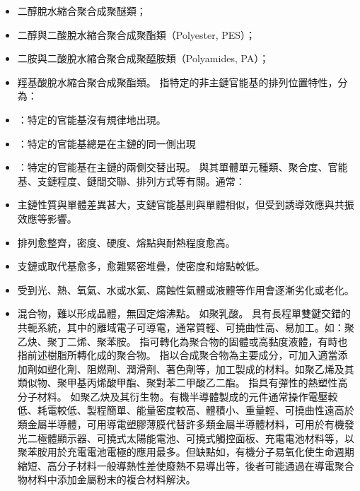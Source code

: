 \documentclass[a4paper,12pt]{report}
\begin{document}
\begin{itemize}
\begin{itemize}
\item 二醇脫水縮合聚合成聚醚類；
\item 二醇與二酸脫水縮合聚合成聚酯類（Polyester, PES）；
\item 二胺與二酸脫水縮合聚合成聚醯胺類（Polyamides, PA）；
\item 羥基酸脫水縮合聚合成聚酯類。
\eit
{}
指特定的非主鏈官能基的排列位置特性，分為：
\bit
\item {}：特定的官能基沒有規律地出現。
\item {}：特定的官能基總是在主鏈的同一側出現
\item {}：特定的官能基在主鏈的兩側交替出現。
\eit
{}
與其單體單元種類、聚合度、官能基、支鏈程度、鏈間交聯、排列方式等有關。通常：
\bit
\item 主鏈性質與單體差異甚大，支鏈官能基則與單體相似，但受到誘導效應與共振效應等影響。
\item 排列愈整齊，密度、硬度、熔點與耐熱程度愈高。
\item 支鏈或取代基愈多，愈難緊密堆疊，使密度和熔點較低。
\item 受到光、熱、氧氣、水或水氣、腐蝕性氣體或液體等作用會逐漸劣化或老化。
\item 混合物，難以形成晶體，無固定熔沸點。
\eit
{}
如聚乳酸。
具有長程單雙鍵交錯的共軛系統，其中的離域電子可導電，通常質輕、可撓曲性高、易加工。如：聚乙炔、聚丁二烯、聚苯胺。
指可轉化為聚合物的固體或高黏度液體，有時也指前述樹脂所轉化成的聚合物。
指以合成聚合物為主要成分，可加入適當添加劑如塑化劑、阻燃劑、潤滑劑、著色劑等，加工製成的材料。如聚乙烯及其類似物、聚甲基丙烯酸甲酯、聚對苯二甲酸乙二酯。
指具有彈性的熱塑性高分子材料。
如聚乙炔及其衍生物。有機半導體製成的元件通常操作電壓較低、耗電較低、製程簡單、能量密度較高、體積小、重量輕、可撓曲性遠高於類金屬半導體，可用導電塑膠薄膜代替許多類金屬半導體材料，可用於有機發光二極體顯示器、可撓式太陽能電池、可撓式觸控面板、充電電池材料等，以聚苯胺用於充電電池電極的應用最多。但缺點如，有機分子易氧化使生命週期縮短、高分子材料一般導熱性差使廢熱不易導出等，後者可能通過在導電聚合物材料中添加金屬粉末的複合材料解決。

\end{itemize}
\end{itemize}
\end{document}
